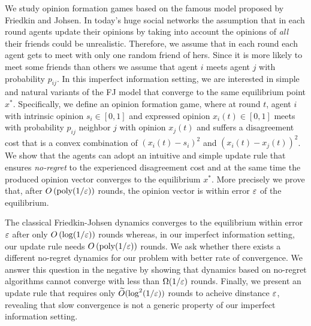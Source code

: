 We study opinion formation games based on the famous model proposed by Friedkin
and Johsen.  In today's huge social networks the assumption that in each round
agents update their opinions by taking into account the opinions of
\emph{all} their friends could be unrealistic. Therefore, we assume that 
in each round each agent gets to meet with only one random friend of
hers. Since it is more likely to meet some friends than others we assume
that agent $i$ meets agent $j$ with probability $p_{ij}$.
In this imperfect information setting, we are interested in simple and 
natural variants of the FJ model that converge to the same equilibrium point $x^*$.
Specifically, we define an opinion formation game, where at round $t$,
agent $i$ with intrinsic opinion $s_i\in[0,1]$ and expressed opinion $x_i(t)
\in[0,1]$ meets with probability $p_{ij}$ neighbor $j$ with opinion $x_j(t)$
and suffers a disagreement cost that is a convex combination of
$(x_i(t) - s_i)^2$ and $(x_i(t) - x_j(t))^2$.
We show that the agents can adopt an intuitive and simple update
rule that ensures \emph{no-regret} to the experienced disagreement cost
and at the same time the produced opinion vector converges
to the equilibrium $x^*$. More precisely we prove that, after 
$O\left(\text{poly}(1/\varepsilon)\right)$ rounds, 
the opinion vector is within error $\varepsilon$  of the equilibrium.

The classical Friedkin-Johsen dynamics converges to the equilibrium within
error $\varepsilon$ after only $O\left(\log(1/\varepsilon\right))$ rounds whereas, in our imperfect
information setting, our update rule needs $O\left(\text{poly}(1/\varepsilon)\right)$ rounds.
We ask whether there exists a different no-regret dynamics for our problem
with better rate of convergence.  We answer this question in the negative
by showing that dynamics based on no-regret algorithms cannot converge with
less than $\Omega(1/\varepsilon)$ rounds. Finally, we present an update rule that
requires only $\widetilde{O}(\text{log}^2(1/\varepsilon))$ rounds to acheive dinstance 
$\varepsilon$, revealing that slow convergence is not a generic property of our
imperfect information setting.



